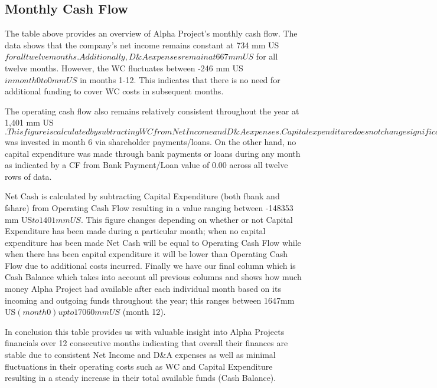 

\subsection{Monthly Cash Flow}\label{sec:title}

The table above provides an overview of Alpha Project's monthly cash flow. The data shows that the company's net income remains constant at 734 mm US$ for all twelve months. Additionally, D\&A expenses remain at 667 mm US$ for all twelve months. However, the WC fluctuates between -246 mm US$ in month 0 to 0 mm US$ in months 1-12. This indicates that there is no need for additional funding to cover WC costs in subsequent months. 

The operating cash flow also remains relatively consistent throughout the year at 1,401 mm US$. This figure is calculated by subtracting WC from Net Income and D\&A expenses. Capital expenditure does not change significantly either; it remains at 0 for most months except when 150000 mm US$ was invested in month 6 via shareholder payments/loans. On the other hand, no capital expenditure was made through bank payments or loans during any month as indicated by a CF from Bank Payment/Loan value of 0.00 across all twelve rows of data. 

Net Cash is calculated by subtracting Capital Expenditure (both fbank and fshare) from Operating Cash Flow resulting in a value ranging between -148353 mm US$ to 1401mm US$. This figure changes depending on whether or not Capital Expenditure has been made during a particular month; when no capital expenditure has been made Net Cash will be equal to Operating Cash Flow while when there has been capital expenditure it will be lower than Operating Cash Flow due to additional costs incurred. Finally we have our final column which is Cash Balance which takes into account all previous columns and shows how much money Alpha Project had available after each individual month based on its incoming and outgoing funds throughout the year; this ranges between 1647mm US$ (month 0) up to 17060mmUS$ (month 12). 

In conclusion this table provides us with valuable insight into Alpha Projects financials over 12 consecutive months indicating that overall their finances are stable due to consistent Net Income and D\&A expenses as well as minimal fluctuations in their operating costs such as WC and Capital Expenditure resulting in a steady increase in their total available funds (Cash Balance).